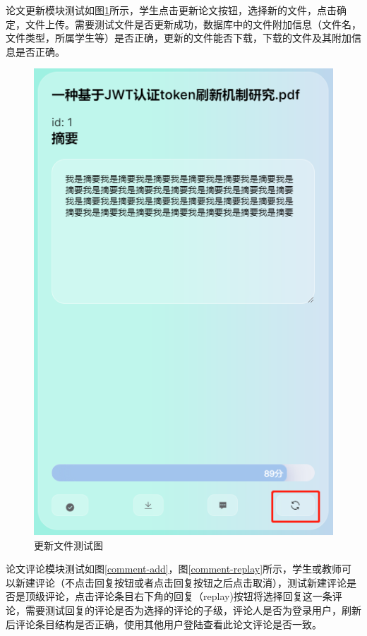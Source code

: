 论文更新模块测试如图\ref{file-refresh-test}所示，学生点击更新论文按钮，选择新的文件，点击确定，文件上传。需要测试文件是否更新成功，数据库中的文件附加信息（文件名，文件类型，所属学生等）是否正确，更新的文件能否下载，下载的文件及其附加信息是否正确。

\begin{figure}[H]
  \centering
  \includegraphics[scale = 0.6]{out/figure/测试/file-refresh-test.png}
  \caption{\song\wuhao 更新文件测试图}
  \label{file-refresh-test}
\end{figure}

论文评论模块测试如图\ref{comment-add}，图\ref{comment-replay}所示，学生或教师可以新建评论（不点击回复按钮或者点击回复按钮之后点击取消），测试新建评论是否是顶级评论，点击评论条目右下角的回复（replay)按钮将选择回复这一条评论，需要测试回复的评论是否为选择的评论的子级，评论人是否为登录用户，刷新后评论条目结构是否正确，使用其他用户登陆查看此论文评论是否一致。

